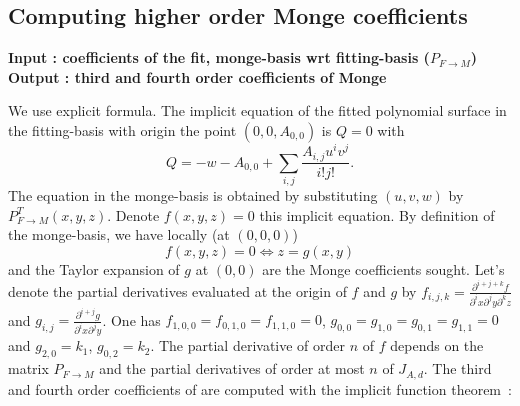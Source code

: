 \subsection{Computing  higher order Monge coefficients}

{\bf Input : coefficients of the fit, monge-basis wrt fitting-basis ($P_{F
\rightarrow M}$)\\ 
Output : third and fourth order coefficients of Monge}

We use explicit formula. The implicit equation of the fitted
polynomial surface in the fitting-basis with origin the point
$(0,0,A_{0,0})$ is $Q=0$ with
\begin{equation}
Q=-w-A_{0,0}  +\sum_{i,j}\frac{A_{i,j}u^iv^j}{i!j!}.
\end{equation}
The equation in the monge-basis is obtained by substituting $(u,v,w)$
by $P^T_{F\rightarrow M}(x,y,z)$. Denote $f(x,y,z)=0$ this implicit
equation. By definition of the monge-basis, we have locally (at
$(0,0,0)$)
\begin{equation}
f(x,y,z)=0 \Leftrightarrow z=g(x,y)
\end{equation}
and the Taylor expansion of $g$ at $(0,0)$ are the Monge coefficients
sought.
%
Let's denote the partial derivatives evaluated at the origin of $f$
and $g$ by $f_{i,j,k}=\frac{\partial^{i+j+k}f}{\partial^ix
\partial^jy \partial^kz}$ and $g_{i,j}=\frac{\partial^{i+j}g}{\partial^ix
\partial^jy}$. One has $f_{1,0,0}=f_{0,1,0}=f_{1,1,0}=0$,
$g_{0,0}=g_{1,0}=g_{0,1}=g_{1,1}=0$ and $g_{2,0}=k_1$,
$g_{0,2}=k_2$. The partial derivative of order $n$ of $f$ depends on
the matrix $P_{F\rightarrow M}$ and the partial derivatives of order
at most $n$ of $J_{A,d}$. The third and fourth order coefficients of are
computed with the implicit function theorem~:
